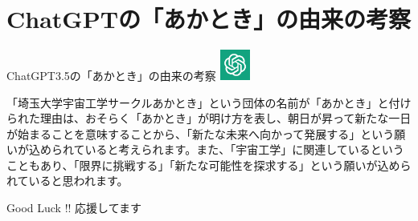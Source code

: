 \documentclass[dvipdfmx, 11pt]{beamer}
\begin{document}
	\section{ChatGPTの「あかとき」の由来の考察}
	\begin{frame}{ChatGPT3.5の「あかとき」の由来の考察}
		\includegraphics[width=1cm]{ChatGPT-Icon-Logo-PNG}
		\vspace{1em}
		
		「埼玉大学宇宙工学サークルあかとき」という団体の名前が「あかとき」と付けられた理由は、おそらく「あかとき」が明け方を表し、朝日が昇って新たな一日が始まることを意味することから、「\alert{新たな未来へ向かって発展する}」という願いが込められていると考えられます。また、「宇宙工学」に関連しているということもあり、「{\Large \color{blue}限界に挑戦する}」「{\Large \color{blue}新たな可能性を探求する}」という願いが込められていると思われます。
		\vspace{2em}
		\begin{alertblock}{Good Luck !!}
			応援してます
		\end{alertblock}
	\end{frame}
\end{document}
